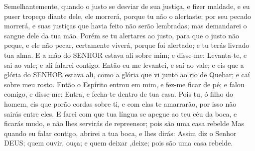 {Semelhantemente, quando o justo se desviar de sua justiça, e fizer maldade, e eu puser
{} tropeço diante dele, ele morrerá, porque tu não o alertaste; por seu pecado morrerá, e suas justiças que havia feito não serão lembradas; mas demandarei o sangue dele da tua mão.
Porém se tu alertares ao justo, para que o justo não peque, e ele não pecar, certamente viverá, porque foi alertado; e tu terás livrado tua alma.
E a mão do SENHOR estava ali sobre mim; e disse-me: Levanta-te, e sai ao vale; e ali falarei contigo.
Então eu me levantei, e saí ao vale; e eis que a glória do SENHOR estava ali, como a glória que vi junto ao rio de Quebar; e caí sobre meu rosto.
Então o Espírito entrou em mim, e fez-me ficar de pé; e falou comigo, e disse-me: Entra, e fecha-te dentro de tua casa.
Pois tu, ó filho do homem, eis que porão cordas sobre ti, e com elas te amarrarão, por isso não sairás entre eles.
E farei com que tua língua se apegue ao teu céu da boca, e ficarás mudo, e não lhes servirás de repreensor; pois são uma casa rebelde
Mas quando eu falar contigo, abrirei a tua boca, e lhes dirás: Assim diz o Senhor DEUS; quem ouvir, ouça; e quem deixar
{} ,deixe; pois são uma casa rebelde.

}

